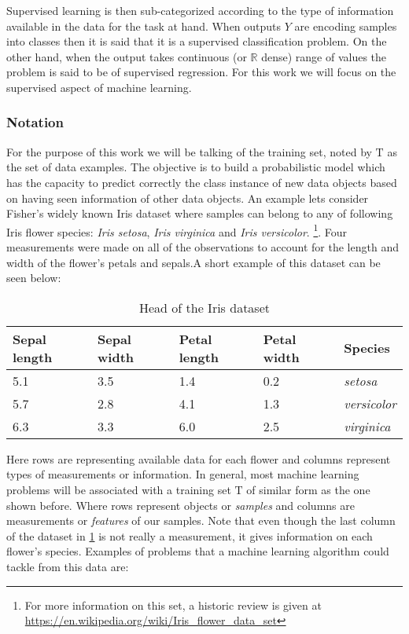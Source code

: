 Supervised learning is then sub-categorized according to the type of information available in the data for the task at hand. When outputs $Y$ are encoding samples into classes then it is said that it is a supervised classification problem. On the other hand, when the output takes continuous (or $\mathbb{R}$ dense) range of values the problem is said to be of supervised regression. For this work we will focus on the supervised aspect of machine learning.

\subsubsection{Notation}

For the purpose of this work we will be talking of the training set, noted by $\mathrm{T}$ as the set of data examples. The objective is to build a probabilistic model which has the capacity to predict correctly the class instance of new data objects based on having seen information of other data objects. An example lets consider Fisher's widely known Iris dataset where samples can belong to any of following Iris flower species: \textit{Iris setosa}, \textit{Iris virginica} and \textit{Iris versicolor}. 
\footnote{For more information on this set, a historic review is given at \url{https://en.wikipedia.org/wiki/Iris_flower_data_set}}.
Four measurements were made on all of the observations to account for the length and width of the flower's petals and sepals.A short example of this dataset can be seen below:

\begin{table}[ht]
\caption{Head of the Iris dataset}
\label{tab:iris_dataset}
\centering
\begin{tabular}{ l l l l l }
\toprule
Sepal length & Sepal width & Petal length & Petal width & Species \\
\midrule
5.1  & 3.5 &  1.4 & 0.2 & \textit{setosa}\\
5.7  & 2.8 &  4.1 & 1.3 & \textit{versicolor} \\
6.3  & 3.3 &  6.0 & 2.5 & \textit{virginica} \\
\bottomrule
\end{tabular}
\end{table}

Here rows are representing available data for each flower and columns represent types of measurements or information. In general, most machine learning problems will be associated with a training set  $\mathrm{T}$ of similar form as the one shown before. Where rows represent objects or \textit{samples} and columns are measurements or \textit{features} of our samples. Note that even though the last column of the dataset in \ref{tab:iris_dataset} is not really a measurement, it gives information on each flower's species. Examples of problems that a machine learning algorithm could tackle from this data are: 

